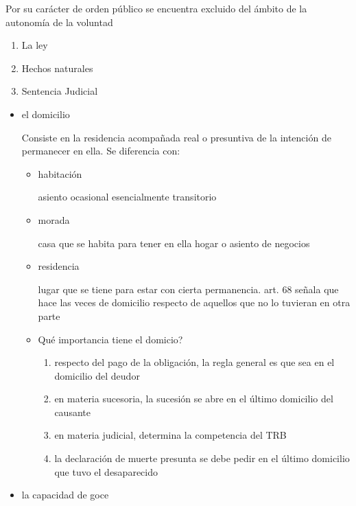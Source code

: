 \documentclass[]{article}
\providecommand{\tightlist}{%
  \setlength{\itemsep}{0pt}\setlength{\parskip}{0pt}}
\begin{document}
\begin{itemize}
\begin{itemize}
\begin{enumerate}
\begin{itemize}
\begin{enumerate}
\begin{itemize}
            Por su carácter de orden público se encuentra excluido del
            ámbito de la autonomía de la voluntad

            \begin{enumerate}
            \def\labelenumiii{\arabic{enumiii}.}
            \tightlist
            \item
              La ley
            \item
              Hechos naturales
            \item
              Sentencia Judicial
            \end{enumerate}
          \end{itemize}
        \end{enumerate}

        \begin{itemize}
        \item
          el domicilio

          Consiste en la residencia acompañada real o presuntiva de la
          intención de permanecer en ella. Se diferencia con:

          \begin{itemize}
          \item
            habitación

            asiento ocasional esencialmente transitorio
          \item
            morada

            casa que se habita para tener en ella hogar o asiento de
            negocios
          \item
            residencia

            lugar que se tiene para estar con cierta permanencia. art.
            68 señala que hace las veces de domicilio respecto de
            aquellos que no lo tuvieran en otra parte
          \item
            Qué importancia tiene el domicio?

            \begin{enumerate}
            \def\labelenumii{\arabic{enumii}.}
            \tightlist
            \item
              respecto del pago de la obligación, la regla general es
              que sea en el domicilio del deudor
            \item
              en materia sucesoria, la sucesión se abre en el último
              domicilio del causante
            \item
              en materia judicial, determina la competencia del TRB
            \item
              la declaración de muerte presunta se debe pedir en el
              último domicilio que tuvo el desaparecido
            \end{enumerate}
          \end{itemize}
        \item
          la capacidad de goce


\end{itemize}
\end{itemize}
\end{enumerate}
\end{itemize}
\end{itemize}
\end{document}
